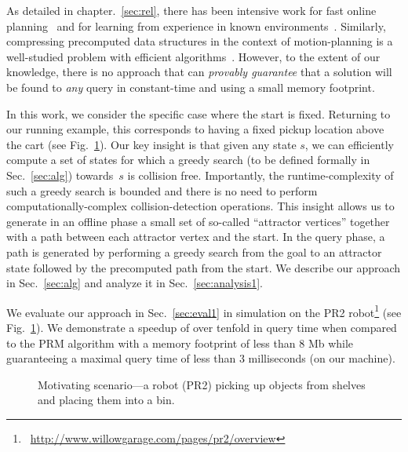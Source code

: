 \documentclass[a4paper]{report}
\begin{document}
As detailed in chapter.~\ref{sec:rel}, there has been intensive work 
for fast online planning~\cite{LA18} and 
for learning from experience in known environments~\cite{PCCL12,PDCL13,berenson2012robot,CSMOC15}.
Similarly, compressing precomputed data structures in the context of motion-planning is a well-studied problem with efficient algorithms~\cite{SSAH14,DB14}.
However, to the extent of our knowledge, there is no approach that can \emph{provably guarantee} that a solution will be found to \emph{any} query in constant-time and using a small memory footprint.


In this work, we consider the specific case where the start is fixed. Returning to our running example, this corresponds to having a fixed pickup location above the cart (see Fig.~\ref{fig:PR2}).
%
Our key insight is that given any state $s$, we can efficiently compute a set of states for which a greedy search (to be defined formally in Sec.~\ref{sec:alg}) towards~$s$ is collision free.
Importantly, the runtime-complexity of such a greedy search is bounded and there is no need to perform computationally-complex collision-detection operations. 
This insight allows us to generate in an offline phase a small set of so-called ``attractor vertices'' together with a path between each attractor vertex and the start.
In the query phase, a path is generated by performing a greedy search from the goal to an attractor state followed by the precomputed path from the start.
We describe our approach in Sec.~\ref{sec:alg} and analyze it in Sec.~\ref{sec:analysis1}.


We evaluate our approach in Sec.~\ref{sec:eval1} in simulation on the PR2 robot\footnote{~\url{http://www.willowgarage.com/pages/pr2/overview}} (see Fig.~\ref{fig:PR2}).
We demonstrate a speedup of over tenfold in query time when compared to the PRM algorithm with a memory footprint of less than 8 Mb while guaranteeing a maximal query time of less than 3 milliseconds (on our machine).


\begin{figure}[tb]
  \centering
  \caption{
  Motivating scenario---a robot (PR2) picking up objects from shelves and placing them into a bin.
}
    \label{fig:PR2}
\end{figure}
\end{document}
